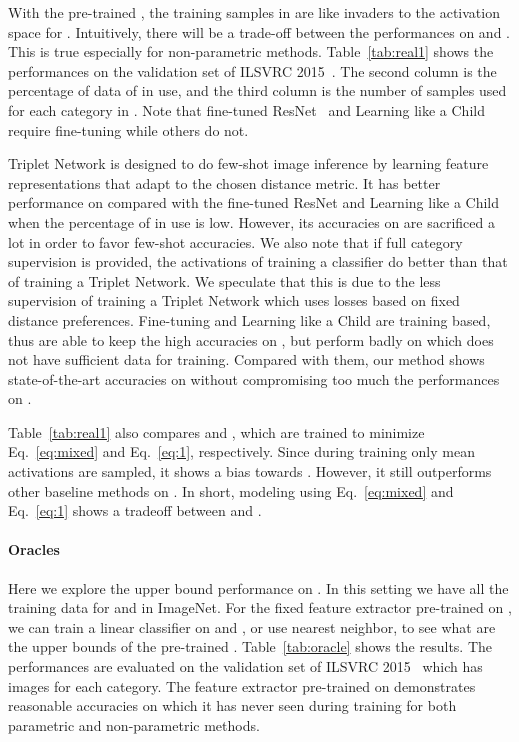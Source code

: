 With the pre-trained \smash{}, the training samples in  are like invaders to the activation space for  .
Intuitively, there will be a trade-off between the performances on  and . This is true especially for non-parametric methods. Table~\ref{tab:real1} shows the performances on the validation set of ILSVRC 2015~\cite{ILSVRC15}. The second column is the percentage of data of  in use, and the third column is the number of samples used for each category in .
Note that fine-tuned ResNet~\cite{DBLP:conf/cvpr/HeZRS16} and Learning like a Child~\cite{mao2015learning} require fine-tuning while others do not.

Triplet Network is designed to do few-shot image inference by learning feature representations that adapt to the chosen distance metric. It has better performance on  compared with the fine-tuned ResNet and Learning like a Child when the percentage of  in use is low. However, its accuracies on  are sacrificed a lot in order to favor few-shot accuracies. We also note that if full category  supervision is provided, the activations of training a classifier do better than that of training a Triplet Network. We speculate that this is due to the less supervision of training a Triplet Network which uses losses based on fixed distance preferences.
Fine-tuning and Learning like a Child are training based, thus are able to keep the high accuracies on , but perform badly on  which does not have sufficient data for training.
Compared with them, our method shows state-of-the-art accuracies on  without compromising too much the performances on .

Table~\ref{tab:real1} also compares  and , which are trained to minimize Eq.~\ref{eq:mixed} and Eq.~\ref{eq:1}, respectively. Since during training  only mean activations are sampled, it shows a bias towards . However, it still outperforms other baseline methods on .
In short, modeling using Eq.~\ref{eq:mixed} and Eq.~\ref{eq:1} shows a tradeoff between  and .



\paragraph{Oracles}
Here we explore the upper bound performance on .
In this setting we have all the training data for  and  in ImageNet.
For the fixed feature extractor  pre-trained on , we can train a linear classifier on  and , or use nearest neighbor, to see what are the upper bounds of the pre-trained . Table~\ref{tab:oracle} shows the results.
The performances are evaluated on the validation set of ILSVRC 2015~\cite{ILSVRC15} which has  images for each category. The feature extractor pre-trained on  demonstrates reasonable accuracies on  which it has never seen during training for both parametric and non-parametric methods.

